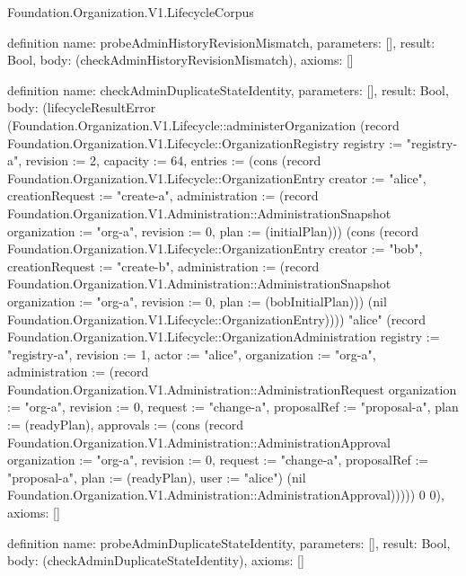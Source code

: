 \begin{lexlean}{Foundation.Organization.V1.LifecycleCorpus}
\begin{semanticmodule}
definition{
  name: probeAdminHistoryRevisionMismatch,
  parameters: [],
  result: Bool,
  body: (checkAdminHistoryRevisionMismatch),
  axioms: []
}

definition{
  name: checkAdminDuplicateStateIdentity,
  parameters: [],
  result: Bool,
  body: (lifecycleResultError (Foundation.Organization.V1.Lifecycle::administerOrganization (record Foundation.Organization.V1.Lifecycle::OrganizationRegistry {registry := "registry-a", revision := 2, capacity := 64, entries := (cons (record Foundation.Organization.V1.Lifecycle::OrganizationEntry {creator := "alice", creationRequest := "create-a", administration := (record Foundation.Organization.V1.Administration::AdministrationSnapshot {organization := "org-a", revision := 0, plan := (initialPlan)})}) (cons (record Foundation.Organization.V1.Lifecycle::OrganizationEntry {creator := "bob", creationRequest := "create-b", administration := (record Foundation.Organization.V1.Administration::AdministrationSnapshot {organization := "org-a", revision := 0, plan := (bobInitialPlan)})}) (nil Foundation.Organization.V1.Lifecycle::OrganizationEntry)))}) "alice" (record Foundation.Organization.V1.Lifecycle::OrganizationAdministration {registry := "registry-a", revision := 1, actor := "alice", organization := "org-a", administration := (record Foundation.Organization.V1.Administration::AdministrationRequest {organization := "org-a", revision := 0, request := "change-a", proposalRef := "proposal-a", plan := (readyPlan), approvals := (cons (record Foundation.Organization.V1.Administration::AdministrationApproval {organization := "org-a", revision := 0, request := "change-a", proposalRef := "proposal-a", plan := (readyPlan), user := "alice"}) (nil Foundation.Organization.V1.Administration::AdministrationApproval))})})) 0 0),
  axioms: []
}

definition{
  name: probeAdminDuplicateStateIdentity,
  parameters: [],
  result: Bool,
  body: (checkAdminDuplicateStateIdentity),
  axioms: []
}


\end{semanticmodule}
\end{lexlean}
